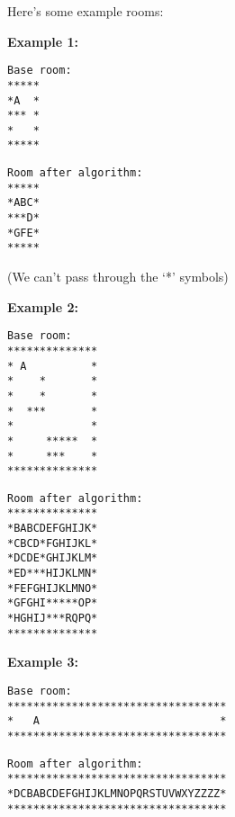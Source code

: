 \documentclass[12pt]{elsart}
\begin{document}
\newpage

Here's some example rooms:

{\bf  Example 1: }

\begin{minipage}[t]{0.5\textwidth}
{\small
\begin{verbatim}
Base room:
*****
*A  *
*** *
*   *
*****
\end{verbatim}
}
\end{minipage}
\begin{minipage}[t]{0.5\textwidth}
{\small
\begin{verbatim}
Room after algorithm:
*****
*ABC*
***D*
*GFE*
*****
\end{verbatim}
}
\end{minipage}

(We can't pass through the `*' symbols)

\vfill


{\bf  Example 2: }

\begin{minipage}[t]{0.5\textwidth}
{\small
\begin{verbatim}
Base room:
**************
* A          *
*    *       *
*    *       *
*  ***       *
*            *
*     *****  *
*     ***    *
**************
\end{verbatim}
}
\end{minipage}
\begin{minipage}[t]{0.5\textwidth}
{\small
\begin{verbatim}
Room after algorithm:
**************
*BABCDEFGHIJK*
*CBCD*FGHIJKL*
*DCDE*GHIJKLM*
*ED***HIJKLMN*
*FEFGHIJKLMNO*
*GFGHI*****OP*
*HGHIJ***RQPQ*
**************
\end{verbatim}
}
\end{minipage}

\vfill

{\bf Example 3:  }

\begin{minipage}[t]{0.5\textwidth}
{\small
\begin{verbatim}
Base room:
**********************************
*   A                            *
**********************************
\end{verbatim}
}
\end{minipage}
\begin{minipage}[t]{0.5\textwidth}
{\small
\begin{verbatim}
Room after algorithm:
**********************************
*DCBABCDEFGHIJKLMNOPQRSTUVWXYZZZZ*
**********************************
\end{verbatim}
}
\end{minipage}
\end{document}
